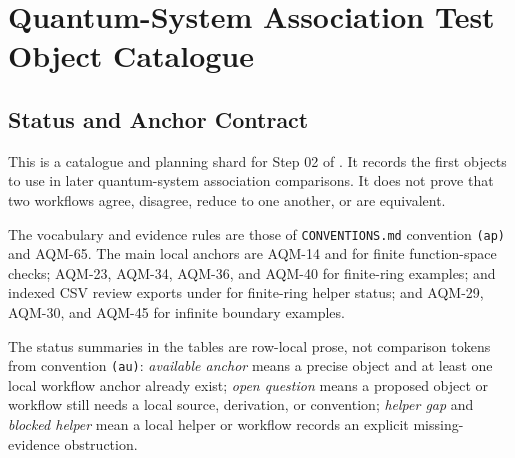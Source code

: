 
\section{Quantum-System Association Test Object Catalogue}
\label{sec:qsa-test-object-catalogue}

\subsection{Status and Anchor Contract}

This is a catalogue and planning shard for Step 02 of
.  It records the first
objects to use in later quantum-system association comparisons.  It does not
prove that two workflows agree, disagree, reduce to one another, or are
equivalent.

The vocabulary and evidence rules are those of
\texttt{CONVENTIONS.md} convention \texttt{(ap)} and
AQM-65.  The main local anchors are AQM-14 and
for finite function-space checks; AQM-23, AQM-34, AQM-36, and AQM-40 for
finite-ring examples; 
and indexed CSV review exports under
 for finite-ring helper
status; and AQM-29, AQM-30, and AQM-45 for infinite boundary examples.

The status summaries in the tables are row-local prose, not comparison
tokens from convention \texttt{(au)}: \emph{available anchor} means a precise
object and at least one local workflow anchor already exist;
\emph{open question} means a proposed object or workflow still needs a local
source, derivation, or convention; \emph{helper gap} and \emph{blocked helper}
mean a local helper or workflow records an explicit missing-evidence
obstruction.

